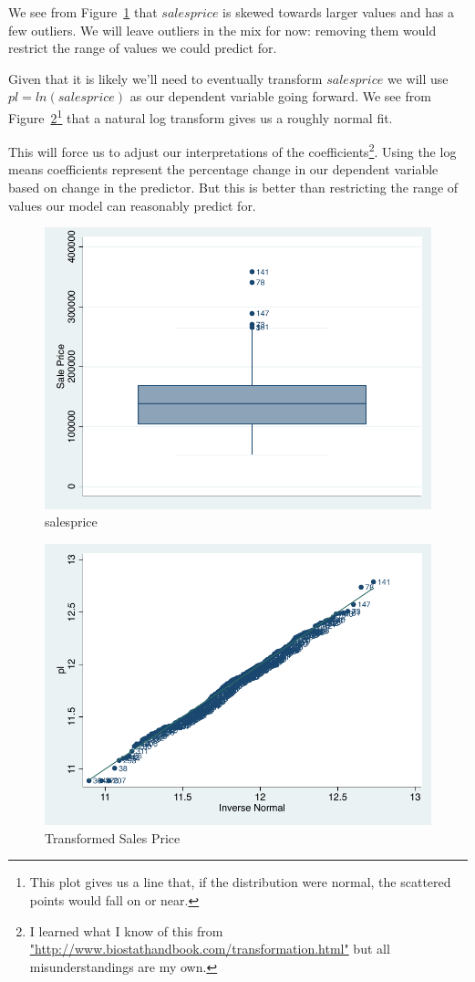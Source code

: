 \documentclass[twocolumn,11pt]{article}
\begin{document}
We see from Figure~\ref{fig:salesprice-box} that
$salesprice$ is skewed towards larger values and has a few outliers.
We will leave outliers in the mix for now:
removing them would restrict the range of values we could predict for.

Given that it is likely we'll need to eventually transform $salesprice$
we will use $pl = ln(salesprice)$ as our dependent variable going forward.
We see from Figure~\ref{fig:pl-qnorm}\footnote{This plot gives
us a line that, if the distribution were normal, the scattered points would fall on or near.}
that a natural log transform gives us a roughly normal fit.

This will force us to adjust our interpretations of the coefficients\footnote{I learned what
I know of this from  \url{"http://www.biostathandbook.com/transformation.html"} but all misunderstandings are my own.}.
Using the log means coefficients represent the percentage change in our dependent variable based on change in the predictor.
But this is better than restricting the range of values our model can reasonably predict for.
\begin{figure}[H]
\centering
  \includegraphics[width=.9\linewidth]{figures/salesprice-box.pdf}
  \caption{salesprice}
  \label{fig:salesprice-box}
\end{figure}
\begin{figure}[H]
  \centering
  \includegraphics[width=.9\linewidth]{figures/pl-qnorm.pdf}
  \caption{Transformed Sales Price}
  \label{fig:pl-qnorm}
\end{figure}
\end{document}
